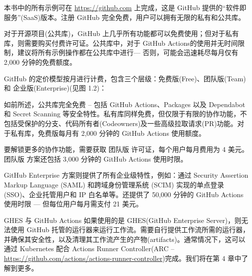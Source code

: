 本书中的所有示例可在 \url{https://github.com} 上完成，这是 GitHub 提供的“软件即服务”(SaaS)版本。注册 GitHub 完全免费，用户可以拥有无限的私有和公共库。

对于开源项目(公共库)，GitHub 上几乎所有功能都可以免费使用；但对于私有库，则需要购买付费许可证。公共库中，对于 GitHub Actions的使用并无时间限制，建议将所有示例操作都在公共库中进行--- 否则，可能会迅速耗尽每月仅有 2,000 分钟的免费额度。

GitHub 的定价模型按月进行计费，包含三个层级：免费版(Free)、团队版(Team) 和 企业版(Enterprise)(见图 1.2)：


如前所述，公共库完全免费 -- 包括 GitHub Actions、Packages 以及 Dependabot 和 Secret Scanning 等安全特性。私有库同样免费，但仅限于有限的协作功能，不包括受保护的分支、代码所有者(Codeowners)及一些高级拉取请求(PR)功能。对于私有库，免费版每月有 2,000 分钟的 GitHub Actions 使用额度。

要解锁更多的协作功能，需要获取 团队版 许可证，每个用户每月费用为 4 美元。团队版 方案还包括 3,000 分钟的 GitHub Actions 使用时限。

GitHub Enterprise 方案则提供了所有企业级特性，例如：通过 Security Assertion Markup Language (SAML) 和跨域身份管理系统 (SCIM) 实现的单点登录 (SSO)、企业托管用户和 IP 白名单等。还提供了 50,000 分钟的 GitHub Actions 使用时限 --- 但每位用户每月需支付 21 美元。

\begin{myTip}{GHES 与 GitHub Actions}
如果使用的是 GHES(GitHub Enterprise Server)，则无法使用 GitHub 托管的运行器来运行工作流。需要自行提供工作流所需的运行器，并确保其安全性，以及清理其工作流产生的产物(artifacts)。通常情况下，这可以通过 Kubernetes 配合 Actions Runner Controller(ARC – \url{https://github.com/actions/actions-runner-controller})完成。我们将在第 4 章中了解到更多。
\end{myTip}








